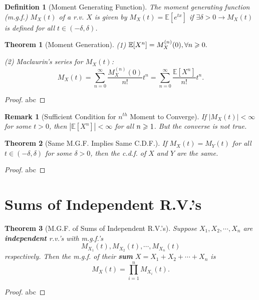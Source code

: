 \documentclass[openany,12pt]{book}
\newtheorem{theorem}{Theorem}[chapter]
\newtheorem{remark}{Remark}[chapter]
\newtheorem{definition}{Definition}[chapter]
\begin{document}
\begin{definition}[Moment Generating Function]
  The moment generating function (m.g.f.) $M_{X}(t)$ of a r.v. $X$ is
  given by
  $M_{X}(t)= \mathbb{E}[ e^{tx}]$
  if $\exists\delta > 0 \to M_{X}(t)$ is defined
  for all $t \in ( - \delta,\delta)$.
\end{definition}

\begin{theorem}[Moment Generation]
  (1)
  $\mathbb{E}[X^{n}] = M_{X}^{\left( n \right)}(0), \forall n \geqslant 0.$

  (2) Maclaurin's series for $M_{X}(t)$:
  \[M_{X}(t)= \sum_{n = 0}^{\infty}\frac{M_{X}^{\left( n \right)}(0)}{n!}t^{n} = \sum_{n = 0}^{\infty}\frac{\mathbb{E}[X^{n}]}{n!}t^{n}.\]
\end{theorem}

\begin{proof}
  abc
\end{proof}

\begin{remark}[Sufficient Condition for $n^{th}$ Moment to Converge]
  If $\left| M_{X}(t) \right| < \infty$ for some $t > 0$,
  then $\left| \mathbb{E}[X^{n}] \right| < \infty$ for
  all $n \geqslant 1$. But the converse is not true.
\end{remark}

\begin{theorem}[Same M.G.F. Implies Same C.D.F.]
  If $M_{X}(t)= M_{Y}(t)$ for all
  $t \in ( - \delta,\delta)$ for some $\delta > 0$, then the c.d.f. of $X$ and $Y$ are the same.
\end{theorem}

\begin{proof}
  abc
\end{proof}

\section{Sums of Independent R.V.'s}

\begin{theorem}[M.G.F. of Sums of Independent R.V.'s]
  Suppose $X_{1}, X_{2}, \cdots,X_{n}$ are \textbf{independent} r.v.'s
  with m.g.f.'s
  \[M_{X_{1}}(t),M_{X_{2}}(t), \cdots,M_{X_{n}}(t)\] respectively. Then the m.g.f. of their \textbf{sum}
  $X = X_{1} +  X_{2} + \cdots +  X_{n}$ is
  \[M_{X}(t)= \prod_{i = 1}^{n}{M_{X_{i}}(t)}.\]
\end{theorem}

\begin{proof}
  abc
\end{proof}
\end{document}
